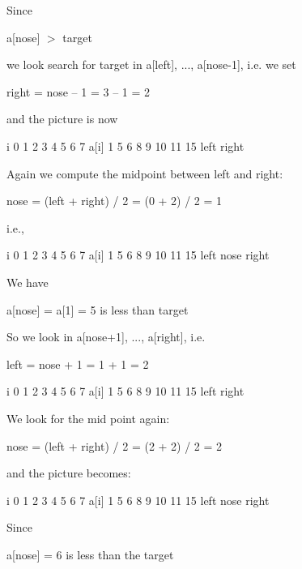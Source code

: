 Since
\begin{center}
a[nose] $>$ target
\end{center}
we look search for target in a[left], ..., a[nose-1], i.e. we set
\begin{center}
right = nose -- 1 = 3 -- 1 = 2
\end{center}
and the picture is now

\begin{consolethree}[escapeinside=||]
i      0    1    2    3    4    5    6    7
a[i]   1    5    6    8    9    10   11   15
    left        right
\end{consolethree}

Again we compute the midpoint between left and right:
\begin{center}
nose = (left + right) / 2 = (0 + 2) / 2 = 1
\end{center}
i.e.,

\begin{consolethree}[escapeinside=||]
i      0    1    2    3    4    5    6    7
a[i]   1    5    6    8    9    10   11   15
    left  nose  right
\end{consolethree}

We have
\begin{center}
a[nose] = a[1] = 5 is less than target
\end{center}
So we look in a[nose+1], ..., a[right], i.e.
\begin{center}
left = nose + 1 = 1 + 1 = 2
\end{center}
\begin{consolethree}[escapeinside=||]
i      0    1    2    3    4    5    6    7
a[i]   1    5    6    8    9    10   11   15
               left
               right
\end{consolethree}

We look for the mid point again:
\begin{center}
nose = (left + right) / 2 = (2 + 2) / 2 = 2
\end{center}
and the picture becomes:

\begin{consolethree}[escapeinside=||]
i      0    1    2    3    4    5    6    7
a[i]   1    5    6    8    9    10   11   15
                left
                nose
                right
\end{consolethree}

Since
\begin{center}
a[nose] = 6 is less than the target
\end{center}

